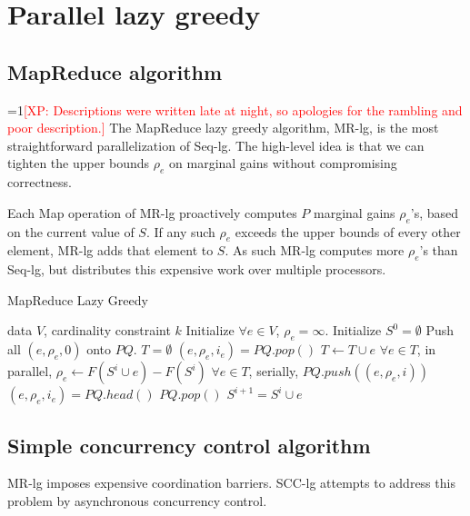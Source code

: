 \documentclass{article}
\newcommand{\Comments}{1}
\newcommand{\note}[2]{\ifnum\Comments=1\textcolor{#1}{#2}\fi}
\newcommand{\xinghao}[1]{\note{red}{[XP: #1]}}
\newcommand{\seqlz}{Seq-lg}
\newcommand{\mrlz}{MR-lg}
\newcommand{\scclz}{SCC-lg}
\begin{document}
\section{Parallel lazy greedy}
\label{sec:parlazy}

\subsection{MapReduce algorithm}
\xinghao{Descriptions were written late at night, so apologies for the rambling and poor description.}
The MapReduce lazy greedy algorithm, \mrlz{}, is the most straightforward parallelization of \seqlz{}.
The high-level idea is that we can tighten the upper bounds $\rho_e$ on marginal gains without compromising correctness.

Each Map operation of \mrlz{} proactively computes $P$ marginal gains $\rho_e$'s, based on the current value of $S$.
If any such $\rho_e$ exceeds the upper bounds of every other element, \mrlz{} adds that element to $S$.
As such \mrlz{} computes more $\rho_e$'s than \seqlz{}, but distributes this expensive work over multiple processors.
\begin{algorithm}[tb]
  \caption{MapReduce Lazy Greedy}
  \label{alg:mrlz}
\begin{algorithmic}[1]
   data $V$, cardinality constraint $k$
  \STATE Initialize $\forall e \in V$, $\rho_e = \infty$.
  \STATE Initialize $S^0 = \emptyset$
  \STATE Push all $(e, \rho_e, 0)$ onto $PQ$.
      \STATE $T = \emptyset$
        \STATE $(e, \rho_e, i_e) = PQ.pop()$
        \STATE $T \leftarrow T \cup e$
      \ENDFOR
      \STATE $\forall e \in T$, in parallel, $\rho_e \leftarrow F(S^i\cup e) - F(S^i)$
      \STATE $\forall e \in T$, serially, $PQ.push((e, \rho_e, i))$
      \STATE $(e, \rho_e, i_e) = PQ.head()$
        \STATE $PQ.pop()$
        \STATE $S^{i+1} = S^i \cup e$
      \ENDIF
    \ENDWHILE
  \ENDFOR
\end{algorithmic}
\end{algorithm}



\subsection{Simple concurrency control algorithm}
\mrlz{} imposes expensive coordination barriers.
\scclz{} attempts to address this problem by asynchronous concurrency control.
\end{document}
